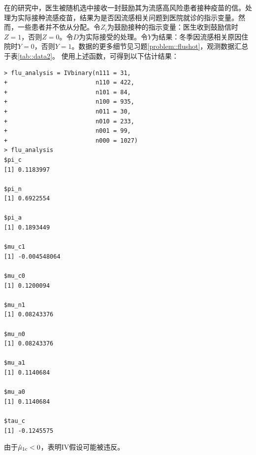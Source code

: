 \begin{example}\label{eg::2-iv-inequalities}
在\citet{hirano2000assessing}的研究中，医生被随机选中接收一封鼓励其为流感高风险患者接种疫苗的信。处理为实际接种流感疫苗，结果为是否因流感相关问题到医院就诊的指示变量。然而，一些患者并不依从分配。令$Z_i$为鼓励接种的指示变量：医生收到鼓励信时$Z=1$，否则$Z=0$。令$D$为实际接受的处理。令$Y$为结果：冬季因流感相关原因住院时$Y=0$，否则$Y=1$。数据的更多细节见习题\ref{problem::flushot}，观测数据汇总于表\ref{tab::data2}。
使用上述函数，可得到以下估计结果：
\begin{lstlisting}
> flu_analysis = IVbinary(n111 = 31,
+                         n110 = 422,
+                         n101 = 84,
+                         n100 = 935,
+                         n011 = 30,
+                         n010 = 233,
+                         n001 = 99,
+                         n000 = 1027)
> flu_analysis
$pi_c
[1] 0.1183997

$pi_n
[1] 0.6922554

$pi_a
[1] 0.1893449

$mu_c1
[1] -0.004548064

$mu_c0
[1] 0.1200094

$mu_n1
[1] 0.08243376

$mu_n0
[1] 0.08243376

$mu_a1
[1] 0.1140684

$mu_a0
[1] 0.1140684

$tau_c
[1] -0.1245575
\end{lstlisting}
由于$\hat\mu_{1\textup{c}} < 0$，表明IV假设可能被违反。 
\end{example} 




